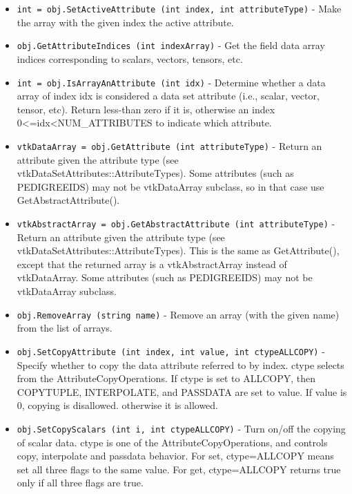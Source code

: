 \begin{itemize}
\item  \verb|int = obj.SetActiveAttribute (int index, int attributeType)| -  Make the array with the given index the active attribute.

\item  \verb|obj.GetAttributeIndices (int indexArray)| -  Get the field data array indices corresponding to scalars, 
 vectors, tensors, etc.

\item  \verb|int = obj.IsArrayAnAttribute (int idx)| -  Determine whether a data array of index idx is considered a data set
 attribute (i.e., scalar, vector, tensor, etc). Return less-than zero 
 if it is, otherwise an index 0<=idx<NUM\_ATTRIBUTES to indicate 
 which attribute.

\item  \verb|vtkDataArray = obj.GetAttribute (int attributeType)| -  Return an attribute given the attribute type
 (see vtkDataSetAttributes::AttributeTypes).
 Some attributes (such as PEDIGREEIDS) may not be vtkDataArray subclass,
 so in that case use GetAbstractAttribute().

\item  \verb|vtkAbstractArray = obj.GetAbstractAttribute (int attributeType)| -  Return an attribute given the attribute type
 (see vtkDataSetAttributes::AttributeTypes).
 This is the same as GetAttribute(), except that the returned array
 is a vtkAbstractArray instead of vtkDataArray.
 Some attributes (such as PEDIGREEIDS) may not be vtkDataArray subclass.

\item  \verb|obj.RemoveArray (string name)| -  Remove an array (with the given name) from the list of arrays.

\item  \verb|obj.SetCopyAttribute (int index, int value, int ctypeALLCOPY)| -  Specify whether to copy the data attribute referred to by index.
 ctype selects from the AttributeCopyOperations.
 If ctype is set to ALLCOPY, then COPYTUPLE, INTERPOLATE, and 
 PASSDATA are set to value. If value is 0, copying is disallowed.
 otherwise it is allowed.

\item  \verb|obj.SetCopyScalars (int i, int ctypeALLCOPY)| -  Turn on/off the copying of scalar data.
 ctype is one of the AttributeCopyOperations, and controls copy, 
 interpolate and passdata behavior.
 For set, ctype=ALLCOPY means set all three flags to the same value.
 For get, ctype=ALLCOPY returns true only if all three flags are true.


\end{itemize}
